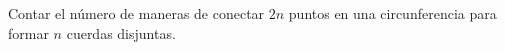\begin{statement}{7}
  Contar el n\'umero de maneras de conectar $2n$ puntos en una circunferencia
  para formar $n$ cuerdas disjuntas.
\end{statement}